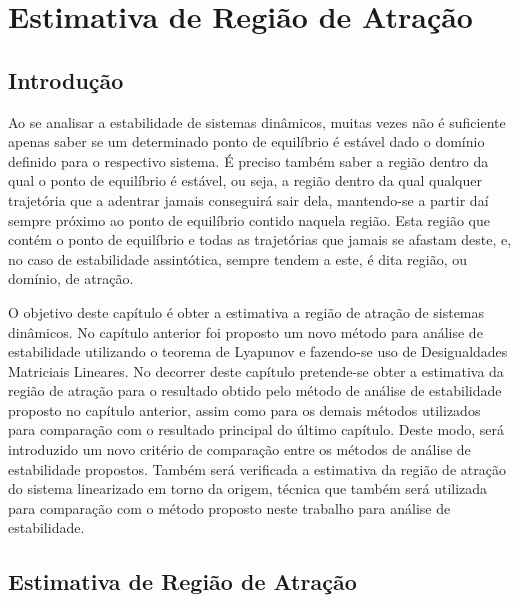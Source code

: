 \chapter{Estimativa de Região de Atração}\label{cap_RegAtrac}

\section{Introdução}

Ao se analisar a estabilidade de sistemas dinâmicos, muitas vezes não é suficiente apenas saber se um determinado ponto de equilíbrio é estável dado o domínio definido para o respectivo sistema. É preciso também saber a região dentro da qual o ponto de equilíbrio é estável, ou seja, a região dentro da qual qualquer trajetória que a adentrar jamais conseguirá sair dela, mantendo-se a partir daí sempre próximo ao ponto de equilíbrio contido naquela região. Esta região que contém o ponto de equilíbrio e todas as trajetórias que jamais se afastam deste, e, no caso de estabilidade assintótica, sempre tendem a este, é dita região, ou domínio, de atração.

O objetivo deste capítulo é obter a estimativa a região de atração de sistemas dinâmicos. No capítulo anterior foi proposto um novo método para análise de estabilidade utilizando o teorema de Lyapunov e fazendo-se uso de Desigualdades Matriciais Lineares. No decorrer deste capítulo pretende-se obter a estimativa da região de atração para o resultado obtido pelo método de análise de estabilidade proposto no capítulo anterior, assim como para os demais métodos utilizados para comparação com o resultado principal do último capítulo. Deste modo, será introduzido um novo critério de comparação entre os métodos de análise de estabilidade propostos. Também será verificada a estimativa da região de atração do sistema linearizado em torno da origem, técnica que também será utilizada para comparação com o método proposto neste trabalho para análise de estabilidade.

\section{Estimativa de Região de Atração}

